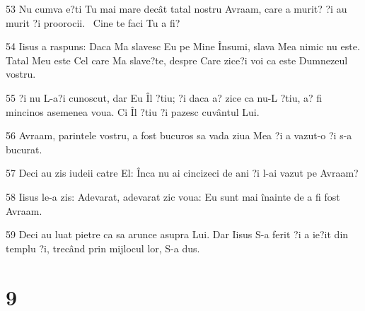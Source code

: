 \par 53 Nu cumva e?ti Tu mai mare decât tatal nostru Avraam, care a murit? ?i au murit ?i proorocii.  Cine te faci Tu a fi?
\par 54 Iisus a raspuns: Daca Ma slavesc Eu pe Mine Însumi, slava Mea nimic nu este. Tatal Meu este Cel care Ma slave?te, despre Care zice?i voi ca este Dumnezeul vostru.
\par 55 ?i nu L-a?i cunoscut, dar Eu Îl ?tiu; ?i daca a? zice ca nu-L ?tiu, a? fi mincinos asemenea voua. Ci Îl ?tiu ?i pazesc cuvântul Lui.
\par 56 Avraam, parintele vostru, a fost bucuros sa vada ziua Mea ?i a vazut-o ?i s-a bucurat.
\par 57 Deci au zis iudeii catre El: Înca nu ai cincizeci de ani ?i l-ai vazut pe Avraam?
\par 58 Iisus le-a zis: Adevarat, adevarat zic voua: Eu sunt mai înainte de a fi fost Avraam.
\par 59 Deci au luat pietre ca sa arunce asupra Lui. Dar Iisus S-a ferit ?i a ie?it din templu ?i, trecând prin mijlocul lor, S-a dus.

\chapter{9}

